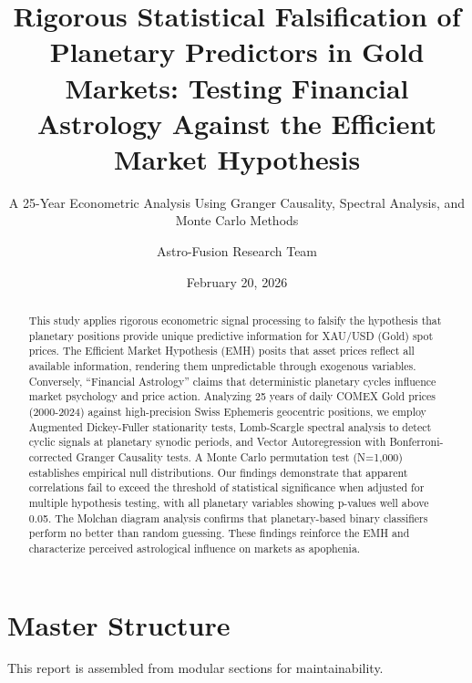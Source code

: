 \documentclass[
  11pt,
  a4paper,
  oneside,
  openany]{article}
\title{Rigorous Statistical Falsification of Planetary Predictors in
Gold Markets: Testing Financial Astrology Against the Efficient Market
Hypothesis}
\subtitle{A 25-Year Econometric Analysis Using Granger Causality,
Spectral Analysis, and Monte Carlo Methods}
\author{Astro-Fusion Research Team}
\date{February 20, 2026}
\renewcommand*\contentsname{Table of contents}
\newcommand\contentsname{Table of contents}
\begin{document}
\maketitle
\begin{abstract}
This study applies rigorous econometric signal processing to falsify the
hypothesis that planetary positions provide unique predictive
information for XAU/USD (Gold) spot prices. The Efficient Market
Hypothesis (EMH) posits that asset prices reflect all available
information, rendering them unpredictable through exogenous variables.
Conversely, ``Financial Astrology'' claims that deterministic planetary
cycles influence market psychology and price action. Analyzing 25 years
of daily COMEX Gold prices (2000-2024) against high-precision Swiss
Ephemeris geocentric positions, we employ Augmented Dickey-Fuller
stationarity tests, Lomb-Scargle spectral analysis to detect cyclic
signals at planetary synodic periods, and Vector Autoregression with
Bonferroni-corrected Granger Causality tests. A Monte Carlo permutation
test (N=1,000) establishes empirical null distributions. Our findings
demonstrate that apparent correlations fail to exceed the threshold of
statistical significance when adjusted for multiple hypothesis testing,
with all planetary variables showing p-values well above 0.05. The
Molchan diagram analysis confirms that planetary-based binary
classifiers perform no better than random guessing. These findings
reinforce the EMH and characterize perceived astrological influence on
markets as apophenia.
\end{abstract}

\renewcommand*\contentsname{Table of contents}
{
\hypersetup{linkcolor=}
\setcounter{tocdepth}{3}
\tableofcontents
}
\listoffigures
\listoftables
{}
\section{Master Structure}\label{master-structure}

\begin{tcolorbox}[enhanced jigsaw, title=\textcolor{quarto-callout-note-color}{\faInfo}\hspace{0.5em}{Note}, colback=white, breakable, opacityback=0, bottomtitle=1mm, colbacktitle=quarto-callout-note-color!10!white, colframe=quarto-callout-note-color-frame, arc=.35mm, toptitle=1mm, titlerule=0mm, rightrule=.15mm, bottomrule=.15mm, toprule=.15mm, leftrule=.75mm, coltitle=black, opacitybacktitle=0.6, left=2mm]

This report is assembled from modular sections for maintainability.

\end{tcolorbox}
\end{document}
